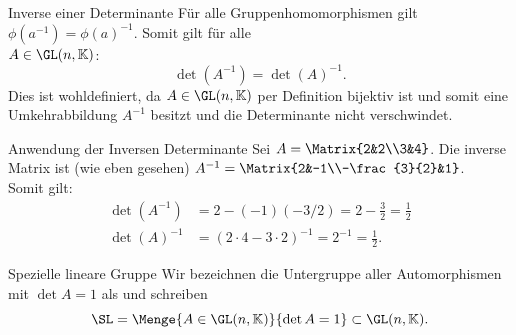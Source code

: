 \begin{Wiederholung}{Inverse einer Determinante}
Für alle Gruppenhomomorphismen gilt $\phi(a^{-1})=\phi(a)^{-1}$. Somit gilt für alle\\
$A\in\GL(n,\mathbb{K})$:
\begin{equation}
    \det(A^{-1})=\det(A)^{-1}.
\end{equation}
Dies ist wohldefiniert, da $A\in\GL(n,\mathbb{K})$ per Definition bijektiv ist und somit eine Umkehrabbildung $A^{-1}$ besitzt und die Determinante nicht verschwindet.
\end{Wiederholung}
\begin{Wiederholung}
{Anwendung der Inversen Determinante}
Sei $A=\Matrix{2&2\\3&4}$. Die inverse Matrix ist (wie eben gesehen) $A^{-1}=\Matrix{2&-1\\-\frac{3}{2}&1}$.\\
Somit gilt:
\begin{align*}
    \det(A^{-1})&=2-(-1)(-3/2)=2-\frac{3}{2}=\frac{1}{2}\\
    \det(A)^{-1}&=(2\cdot 4-3\cdot 2)^{-1}=2^{-1}=\frac{1}{2}.
\end{align*}
\end{Wiederholung}
\begin{Def}
{Spezielle lineare Gruppe}
Wir bezeichnen die Untergruppe aller Automorphismen mit $\det A=1$ als  und schreiben
\begin{equation}
    \SL=\Menge{A\in \GL(n,\mathbb{K})}{\det A=1}\subset \GL(n,\mathbb{K}).
\end{equation}
\end{Def}


